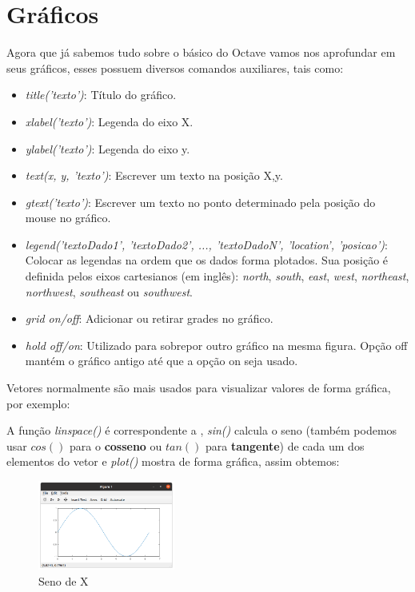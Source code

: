 \documentclass[a4paper,11pt]{article}
\begin{document}
\section{Gráficos}
Agora que já sabemos tudo sobre o básico do Octave vamos nos aprofundar em seus gráficos, esses possuem diversos comandos auxiliares, tais como:
\begin{itemize}[nolistsep]
	\item \textit{title('texto')}: Título do gráfico.
	\item \textit{xlabel('texto')}: Legenda do eixo X.
	\item \textit{ylabel('texto')}: Legenda do eixo y.
	\item \textit{text(x, y, 'texto')}: Escrever um texto na posição X,y.
	\item \textit{gtext('texto')}: Escrever um texto no ponto determinado pela posição do mouse no gráfico.
	\item \textit{legend('textoDado1', 'textoDado2', ..., 'textoDadoN', 'location', 'posicao')}: Colocar as legendas na ordem que os dados forma plotados. Sua posição é definida pelos eixos cartesianos (em inglês): \textit{north}, \textit{south}, \textit{east}, \textit{west}, \textit{northeast}, \textit{northwest}, \textit{southeast} ou \textit{southwest}.
	\item \textit{grid on/off}: Adicionar ou retirar grades no gráfico.
	\item \textit{hold off/on}: Utilizado para sobrepor outro gráfico na mesma figura. Opção off mantém o gráfico antigo até que a opção on seja usado.
\end{itemize}

Vetores normalmente são mais usados para visualizar valores de forma gráfica, por exemplo: \\

A função \textit{linspace()} é correspondente a \codigo{[0: 2 * pi / 100: 2 * pi]}, \textit{sin()} calcula o seno (também podemos usar $cos()$ para o \textbf{cosseno} ou $tan()$ para \textbf{tangente}) de cada um dos elementos do vetor e \textit{plot()} mostra de forma gráfica, assim obtemos:
\begin{figure}[H]
	\centering
	\includegraphics[width=0.4\textwidth]{imagem/senoX}
	\caption{Seno de X}
\end{figure}
\end{document}
